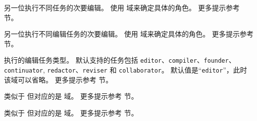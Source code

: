\begin{fieldlist}

另一位执行不同任务的次要编辑。
使用  域来确定具体的角色。
更多提示参考  节。




另一位执行不同编辑任务的次要编辑。
使用  域来确定具体的角色。
更多提示参考  节。




 执行的编辑任务类型。
默认支持的任务包括 \texttt{editor}、\texttt{compiler}、\texttt{founder}、\texttt{continuator}, \texttt{redactor}、\texttt{reviser} 和 \texttt{collaborator}。
默认值是“\texttt{editor}”，此时该域可以省略。
更多提示参考  节。




类似于  但对应的是  域。
更多提示参考  节。




类似于  但对应的是  域。
更多提示参考  节。




\end{fieldlist}
